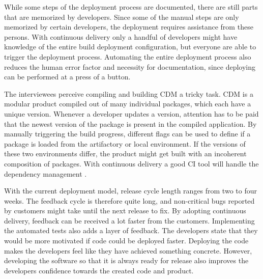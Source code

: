 \documentclass[english, grading]{tktltiki2}
\theoremstyle{definition}
\theoremstyle{remark}
\begin{document}
While some steps of the deployment process are documented, there are still parts that are memorized by developers. Since some of the manual steps are only memorized by certain developers, the deployment requires assistance from these persons. With continuous delivery only a handful of developers might have knowledge of the entire build deployment configuration, but everyone are able to trigger the deployment process. Automating the entire deployment process also reduces the human error factor and necessity for documentation, since deploying can be performed at a press of a button. 

The interviewees perceive compiling and building CDM a tricky task. CDM is a modular product compiled out of many individual packages, which each have a unique version. Whenever a developer updates a version, attention has to be paid that the newest version of the package is present in the compiled application. By manually triggering the build progress, different flags can be used to define if a package is loaded from the artifactory or local environment. If the versions of these two environments differ, the product might get built with an incoherent composition of packages. With continuous delivery a good CI tool will handle the dependency management \cite{cdbook}.



With the current deployment model, release cycle length ranges from two to four weeks. The feedback cycle is therefore quite long, and non-critical bugs reported by customers might take until the next release to fix. By adopting continuous delivery, feedback can be received a lot faster from the customers. Implementing the automated tests also adds a layer of feedback. The developers state that they would be more motivated if code could be deployed faster. Deploying the code makes the developers feel like they have achieved something concrete. However, developing the software so that it is always ready for release also improves the developers confidence towards the created code and product.
\end{document}
